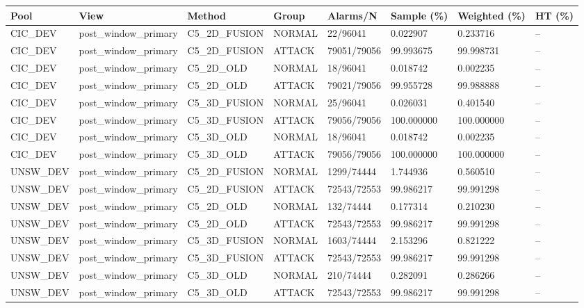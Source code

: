 \begin{tabular}{llllllll}
\hline
Pool & View & Method & Group & Alarms/N & Sample (\%) & Weighted (\%) & HT (\%) \\
\hline
CIC\_DEV & post\_window\_primary & C5\_2D\_FUSION & NORMAL & 22/96041 & 0.022907 & 0.233716 & -- \\
CIC\_DEV & post\_window\_primary & C5\_2D\_FUSION & ATTACK & 79051/79056 & 99.993675 & 99.998731 & -- \\
CIC\_DEV & post\_window\_primary & C5\_2D\_OLD & NORMAL & 18/96041 & 0.018742 & 0.002235 & -- \\
CIC\_DEV & post\_window\_primary & C5\_2D\_OLD & ATTACK & 79021/79056 & 99.955728 & 99.988888 & -- \\
CIC\_DEV & post\_window\_primary & C5\_3D\_FUSION & NORMAL & 25/96041 & 0.026031 & 0.401540 & -- \\
CIC\_DEV & post\_window\_primary & C5\_3D\_FUSION & ATTACK & 79056/79056 & 100.000000 & 100.000000 & -- \\
CIC\_DEV & post\_window\_primary & C5\_3D\_OLD & NORMAL & 18/96041 & 0.018742 & 0.002235 & -- \\
CIC\_DEV & post\_window\_primary & C5\_3D\_OLD & ATTACK & 79056/79056 & 100.000000 & 100.000000 & -- \\
UNSW\_DEV & post\_window\_primary & C5\_2D\_FUSION & NORMAL & 1299/74444 & 1.744936 & 0.560510 & -- \\
UNSW\_DEV & post\_window\_primary & C5\_2D\_FUSION & ATTACK & 72543/72553 & 99.986217 & 99.991298 & -- \\
UNSW\_DEV & post\_window\_primary & C5\_2D\_OLD & NORMAL & 132/74444 & 0.177314 & 0.210230 & -- \\
UNSW\_DEV & post\_window\_primary & C5\_2D\_OLD & ATTACK & 72543/72553 & 99.986217 & 99.991298 & -- \\
UNSW\_DEV & post\_window\_primary & C5\_3D\_FUSION & NORMAL & 1603/74444 & 2.153296 & 0.821222 & -- \\
UNSW\_DEV & post\_window\_primary & C5\_3D\_FUSION & ATTACK & 72543/72553 & 99.986217 & 99.991298 & -- \\
UNSW\_DEV & post\_window\_primary & C5\_3D\_OLD & NORMAL & 210/74444 & 0.282091 & 0.286266 & -- \\
UNSW\_DEV & post\_window\_primary & C5\_3D\_OLD & ATTACK & 72543/72553 & 99.986217 & 99.991298 & -- \\

\end{tabular}
